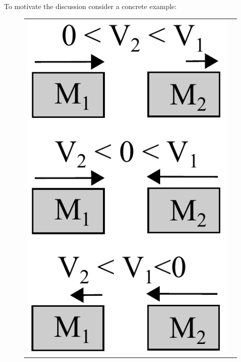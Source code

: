 \documentclass{article}
\begin{document}
To motivate the discussion consider a concrete example:  
\begin{figure}[t!]
\vspace{-0mm}
\begin{center}
\begin{tabular}{cc}
   \hspace{-0mm} \includegraphics[width=\linewidth/6]{Figs/little-momentum0.pdf} 

\end{tabular}
\end{center}
\end{figure}
\end{document}
